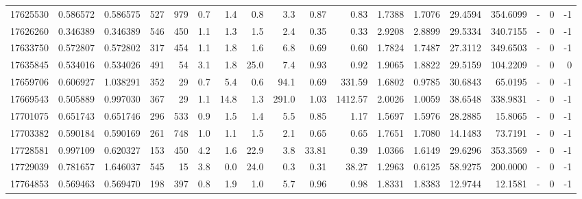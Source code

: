 \begin{tabular}{rrrrrrrrrrrrrrrlrr}
  17625530 & 0.586572 &   0.586575 &  527 &  979 &      0.7 &      1.4 &     0.8 &      3.3 &       0.87 &        0.83 &  1.7388 &  1.7076 &   29.4594 &  354.6099 &             - &        0 &         -1 \\
  17626260 & 0.346389 &   0.346389 &  546 &  450 &      1.1 &      1.3 &     1.5 &      2.4 &       0.35 &        0.33 &  2.9208 &  2.8899 &   29.5334 &  340.7155 &             - &        0 &         -1 \\
  17633750 & 0.572807 &   0.572802 &  317 &  454 &      1.1 &      1.8 &     1.6 &      6.8 &       0.69 &        0.60 &  1.7824 &  1.7487 &   27.3112 &  349.6503 &             - &        0 &         -1 \\
  17635845 & 0.534016 &   0.534026 &  491 &   54 &      3.1 &      1.8 &    25.0 &      7.4 &       0.93 &        0.92 &  1.9065 &  1.8822 &   29.5159 &  104.2209 &             - &        0 &          0 \\
  17659706 & 0.606927 &   1.038291 &  352 &   29 &      0.7 &      5.4 &     0.6 &     94.1 &       0.69 &      331.59 &  1.6802 &  0.9785 &   30.6843 &   65.0195 &             - &        0 &         -1 \\
  17669543 & 0.505889 &   0.997030 &  367 &   29 &      1.1 &     14.8 &     1.3 &    291.0 &       1.03 &     1412.57 &  2.0026 &  1.0059 &   38.6548 &  338.9831 &             - &        0 &         -1 \\
  17701075 & 0.651743 &   0.651746 &  296 &  533 &      0.9 &      1.5 &     1.4 &      5.5 &       0.85 &        1.17 &  1.5697 &  1.5976 &   28.2885 &   15.8065 &             - &        0 &         -1 \\
  17703382 & 0.590184 &   0.590169 &  261 &  748 &      1.0 &      1.1 &     1.5 &      2.1 &       0.65 &        0.65 &  1.7651 &  1.7080 &   14.1483 &   73.7191 &             - &        0 &         -1 \\
  17728581 & 0.997109 &   0.620327 &  153 &  450 &      4.2 &      1.6 &    22.9 &      3.8 &      33.81 &        0.39 &  1.0366 &  1.6149 &   29.6296 &  353.3569 &             - &        0 &         -1 \\
  17729039 & 0.781657 &   1.646037 &  545 &   15 &      3.8 &      0.0 &    24.0 &      0.3 &       0.31 &       38.27 &  1.2963 &  0.6125 &   58.9275 &  200.0000 &             - &        0 &         -1 \\
  17764853 & 0.569463 &   0.569470 &  198 &  397 &      0.8 &      1.9 &     1.0 &      5.7 &       0.96 &        0.98 &  1.8331 &  1.8383 &   12.9744 &   12.1581 &             - &        0 &         -1 \\

\end{tabular}

